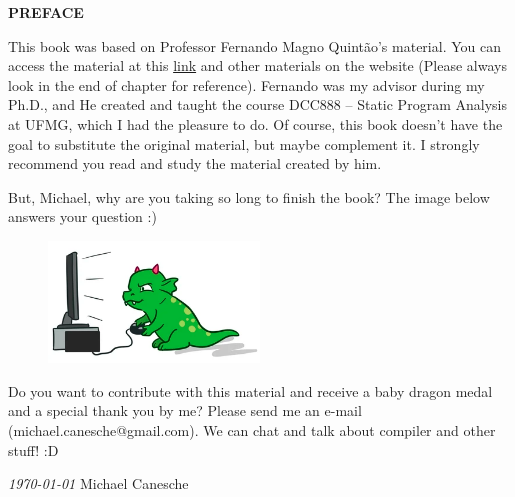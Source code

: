 \begin{center}
    \textbf{\Large{PREFACE}}
\end{center}

This book was based on Professor Fernando Magno Quintão's material. You can access the material at this \hyperlink{https://homepages.dcc.ufmg.br/~fernando/classes/dcc888/}{link} and other materials on the website (Please always look in the end of chapter for reference). Fernando was my advisor during my Ph.D., and He created and taught the course DCC888 – Static Program Analysis at UFMG, which I had the pleasure to do. Of course, this book doesn't have the goal to substitute the original material, but maybe complement it. I strongly recommend you read and study the material created by him.

But, Michael, why are you taking so long to finish the book? The image below answers your question :)

\begin{figure}[!ht]
    \centering
    \includegraphics[width=0.5\textwidth]{images/dragon.png}
\end{figure}

Do you want to contribute with this material and receive a baby dragon medal and a special thank you by me? Please send me an e-mail (michael.canesche@gmail.com). We can chat and talk about compiler and other stuff! :D 

\vspace{\baselineskip}

\textit{\today} \hfill Michael Canesche
